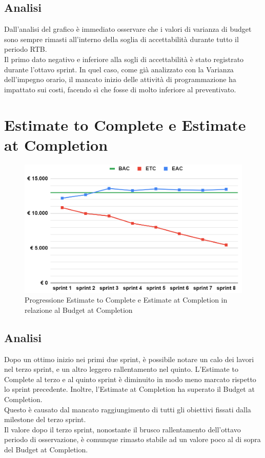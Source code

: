 \subsection{Analisi}
Dall'analisi del grafico è immediato osservare che i valori di varianza di budget sono sempre rimasti all'interno della soglia di accettabilità durante tutto il periodo RTB.\\
Il primo dato negativo e inferiore alla sogli di accettabilità è stato registrato durante l'ottavo sprint. In quel caso, come già analizzato con la Varianza dell'impegno orario, il mancato inizio delle attività di programmazione ha impattato sui costi, facendo sì che fosse di molto inferiore al preventivato.

\section{Estimate to Complete e Estimate at Completion}
\begin{figure}[H]
    \centering
    \includegraphics[width=0.8\linewidth]{ETCEAC.png}
    \caption{Progressione Estimate to Complete e Estimate at Completion in relazione al Budget at Completion}
\end{figure}
\subsection{Analisi}
Dopo un ottimo inizio nei primi due sprint, è possibile notare un calo dei lavori nel terzo sprint, e un altro leggero rallentamento nel quinto. L'Estimate to Complete al terzo e al quinto sprint è diminuito in modo meno marcato rispetto lo sprint precedente. Inoltre, l'Estimate at Completion ha superato il Budget at Completion.\\
Questo è causato dal mancato raggiungimento di tutti gli obiettivi fissati dalla milestone del terzo sprint.\\
Il valore dopo il terzo sprint, nonostante il brusco rallentamento dell'ottavo periodo di osservazione, è comunque rimasto stabile ad un valore poco al di sopra del Budget at Completion.

